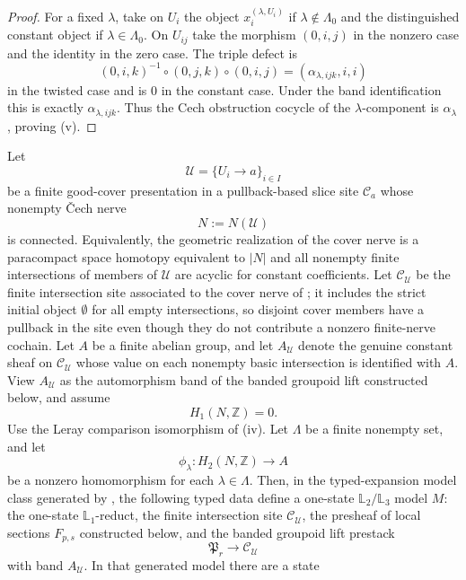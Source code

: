 \begin{proof}
For a fixed $\lambda$, take on $U_i$ the object $x_i^{(\lambda,U_i)}$ if $\lambda\notin\Lambda_0$ and the distinguished constant object if $\lambda\in\Lambda_0$. On $U_{ij}$ take the morphism $(0,i,j)$ in the nonzero case and the identity in the zero case. The triple defect is
\[
(0,i,k)^{-1}\circ(0,j,k)\circ(0,i,j)
=
(\alpha_{\lambda,ijk},i,i)
\]
in the twisted case and is $0$ in the constant case. Under the band identification this is exactly $\alpha_{\lambda,ijk}$. Thus the Cech obstruction cocycle of the $\lambda$-component is $\alpha_\lambda$, proving \textup{(v)}.
\end{proof}

\begin{theorem}\label{thm:prescribed-branch-realization}
Let
\[
\mathcal U=\{U_i\to a\}_{i\in I}
\]
be a finite good-cover presentation in a pullback-based slice site $\mathcal C_a$ whose nonempty \v{C}ech nerve
\[
N:=N(\mathcal U)
\]
is connected. Equivalently, the geometric realization of the cover nerve is a
paracompact space homotopy equivalent to $|N|$ and all nonempty finite
intersections of members of $\mathcal U$ are acyclic for constant
coefficients. Let $\mathcal C_{\mathcal U}$ be the finite intersection site associated to the cover nerve of
; it includes the strict
initial object $\emptyset$ for all empty intersections, so disjoint cover
members have a pullback in the site even though they do not contribute a
nonzero finite-nerve cochain. Let $A$ be a finite abelian group, and let
$A_{\mathcal U}$ denote the genuine constant sheaf on
$\mathcal C_{\mathcal U}$ whose value on each nonempty basic intersection
is identified with $A$. View $A_{\mathcal U}$ as the automorphism band of
the banded groupoid lift constructed below, and assume
\[
H_1(N,\mathbb Z)=0.
\]
Use the Leray comparison isomorphism of
(iv). Let $\Lambda$ be a finite nonempty set, and let
\[
\phi_\lambda:H_2(N,\mathbb Z)\to A
\]
be a nonzero homomorphism for each $\lambda\in\Lambda$. Then, in the
typed-expansion model class generated by
, the following typed data
define a one-state $\mathbb L_2/\mathbb L_3$ model \(M\): the one-state
\(\mathbb L_1\)-reduct, the finite intersection site \(\mathcal C_{\mathcal U}\), the
presheaf of local sections \(F_{p,s}\) constructed below, and the banded groupoid lift
prestack
\[
\mathfrak P_r\to \mathcal C_{\mathcal U}
\]
with band \(A_{\mathcal U}\). In that generated model there are a state

\end{theorem}
